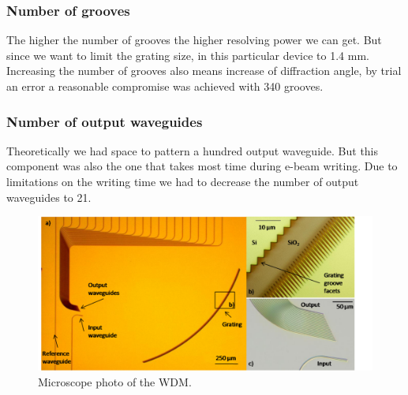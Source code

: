 \documentclass[12pt,twoside,english]{book}
\renewcommand{\~}{\perispomeni}%
\numberwithin{equation}{section}
\numberwithin{figure}{section}
\begin{document}
\subsubsection{Number of grooves}
The higher the number of grooves the higher resolving power we can get. But since we want to limit the grating size, in this particular device to 1.4 mm. Increasing the number of grooves also means increase of diffraction angle, by trial an error a reasonable compromise was achieved with 340 grooves. 

\subsubsection{Number of output waveguides}
Theoretically we had space to pattern a hundred output waveguide. But this component was also the one that takes most time during e-beam writing. Due to limitations on the writing time we had to decrease the number of output waveguides to 21.
\begin{figure}[h]
\centering\includegraphics[width=1\textwidth]{./wdm}
\caption{Microscope photo of the WDM.}
\end{figure}
\end{document}
